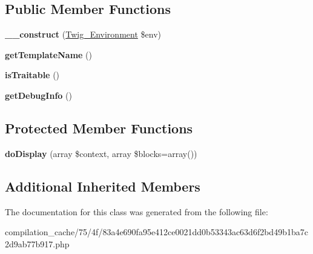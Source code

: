 \subsection*{Public Member Functions}
\begin{DoxyCompactItemize}
\item 
\hypertarget{class_____twig_template__754f83a4e690fa95e412ce0021dd0b53343ac63d6f2bd49b1ba7c2d9ab77b917_a4f8326243132c1450a81e0a817aa1be7}{}{\bfseries \+\_\+\+\_\+construct} (\hyperlink{class_twig___environment}{Twig\+\_\+\+Environment} \$env)\label{class_____twig_template__754f83a4e690fa95e412ce0021dd0b53343ac63d6f2bd49b1ba7c2d9ab77b917_a4f8326243132c1450a81e0a817aa1be7}

\item 
\hypertarget{class_____twig_template__754f83a4e690fa95e412ce0021dd0b53343ac63d6f2bd49b1ba7c2d9ab77b917_a621a3ccd148ed8b9e937da6959c98f39}{}{\bfseries get\+Template\+Name} ()\label{class_____twig_template__754f83a4e690fa95e412ce0021dd0b53343ac63d6f2bd49b1ba7c2d9ab77b917_a621a3ccd148ed8b9e937da6959c98f39}

\item 
\hypertarget{class_____twig_template__754f83a4e690fa95e412ce0021dd0b53343ac63d6f2bd49b1ba7c2d9ab77b917_aa9eb89be270f6afc256ef5e272b78a63}{}{\bfseries is\+Traitable} ()\label{class_____twig_template__754f83a4e690fa95e412ce0021dd0b53343ac63d6f2bd49b1ba7c2d9ab77b917_aa9eb89be270f6afc256ef5e272b78a63}

\item 
\hypertarget{class_____twig_template__754f83a4e690fa95e412ce0021dd0b53343ac63d6f2bd49b1ba7c2d9ab77b917_abd0ecb0136f4228db2bd963bfc1e20d7}{}{\bfseries get\+Debug\+Info} ()\label{class_____twig_template__754f83a4e690fa95e412ce0021dd0b53343ac63d6f2bd49b1ba7c2d9ab77b917_abd0ecb0136f4228db2bd963bfc1e20d7}

\end{DoxyCompactItemize}
\subsection*{Protected Member Functions}
\begin{DoxyCompactItemize}
\item 
\hypertarget{class_____twig_template__754f83a4e690fa95e412ce0021dd0b53343ac63d6f2bd49b1ba7c2d9ab77b917_adb62b7c226e07d30f836ed16158d924f}{}{\bfseries do\+Display} (array \$context, array \$blocks=array())\label{class_____twig_template__754f83a4e690fa95e412ce0021dd0b53343ac63d6f2bd49b1ba7c2d9ab77b917_adb62b7c226e07d30f836ed16158d924f}

\end{DoxyCompactItemize}
\subsection*{Additional Inherited Members}


The documentation for this class was generated from the following file\+:\begin{DoxyCompactItemize}
\item 
compilation\+\_\+cache/75/4f/83a4e690fa95e412ce0021dd0b53343ac63d6f2bd49b1ba7c2d9ab77b917.\+php\end{DoxyCompactItemize}
